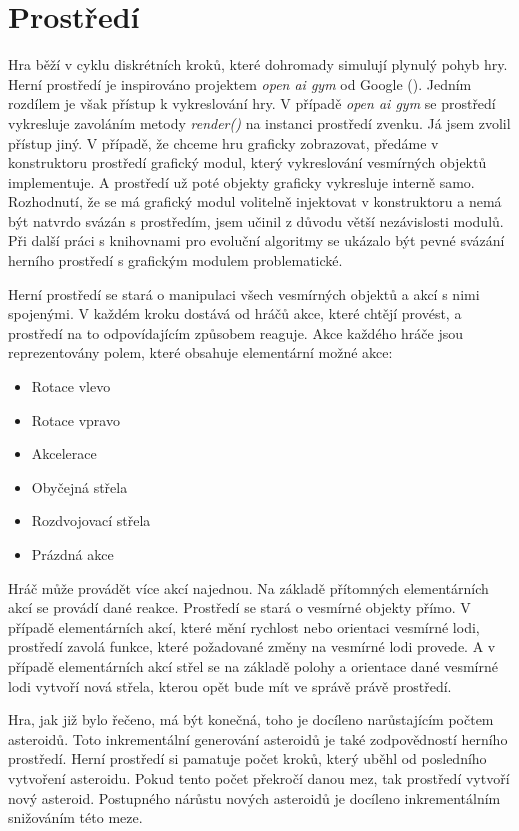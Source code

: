 \newpage



\section{Prostředí}

Hra běží v cyklu diskrétních kroků, které dohromady simulují plynulý pohyb hry.
Herní prostředí je inspirováno projektem \emph{open ai gym} od Google
(\cite{openAiGym}). Jedním rozdílem je však přístup k vykreslování hry. V případě \emph{open ai gym} se prostředí vykresluje zavoláním metody \emph{render()} na instanci prostředí zvenku.
Já jsem zvolil přístup jiný. V případě, že chceme hru graficky zobrazovat, předáme v konstruktoru prostředí grafický modul, který vykreslování vesmírných objektů implementuje.
A prostředí už poté objekty graficky vykresluje interně samo. 
Rozhodnutí, že se má grafický modul volitelně injektovat v konstruktoru a nemá být natvrdo svázán s prostředím, jsem učinil z důvodu větší nezávislosti modulů. 
Při další práci s knihovnami pro evoluční algoritmy se ukázalo být pevné svázání herního prostředí s grafickým modulem problematické.
\par

Herní prostředí se stará o manipulaci všech vesmírných objektů a akcí s nimi spojenými. 
V každém kroku dostává od hráčů akce, které chtějí provést, a prostředí na to odpovídajícím způsobem reaguje. 
Akce každého hráče jsou reprezentovány polem, které obsahuje elementární možné akce:
\begin{itemize}
    \item Rotace vlevo
    \item Rotace vpravo
    \item Akcelerace
    \item Obyčejná střela
    \item Rozdvojovací střela
    \item Prázdná akce
\end{itemize} 
Hráč může provádět více akcí najednou. Na základě přítomných elementárních akcí se provádí dané reakce.
Prostředí se stará o vesmírné objekty přímo. V případě elementárních akcí, které mění rychlost nebo orientaci vesmírné lodi, prostředí zavolá funkce, které požadované změny na vesmírné lodi provede.
A v případě elementárních akcí střel se na základě polohy a orientace dané vesmírné lodi vytvoří nová střela, kterou opět bude mít ve správě právě prostředí.

\par
Hra, jak již bylo řečeno, má být konečná, toho je docíleno narůstajícím počtem asteroidů. Toto inkrementální generování asteroidů je také zodpovědností herního prostředí.
Herní prostředí si pamatuje počet kroků, který uběhl od posledního vytvoření asteroidu. Pokud tento počet překročí danou mez, tak prostředí vytvoří nový asteroid.
Postupného nárůstu nových asteroidů je docíleno inkrementálním snižováním této meze.

